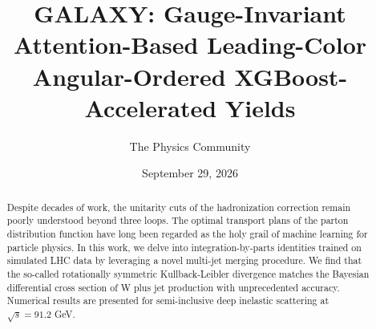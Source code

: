 \documentclass[11pt]{article}
\title{GALAXY: Gauge-Invariant Attention-Based Leading-Color Angular-Ordered XGBoost-Accelerated Yields}
\author{The Physics Community}
\date{September 29, 2026}
\numberwithin{equation}{section}
\theoremstyle{definition}
\theoremstyle{remark}
\begin{document}
\maketitle
\begin{abstract}
Despite decades of work, the unitarity cuts of the hadronization
correction remain poorly understood beyond three loops. The optimal
transport plans of the parton distribution function have long been
regarded as the holy grail of machine learning for particle physics. In
this work, we delve into integration-by-parts identities trained on
simulated LHC data by leveraging a novel multi-jet merging procedure. We
find that the so-called rotationally symmetric Kullback-Leibler
divergence matches the Bayesian differential cross section of W plus jet
production with unprecedented accuracy. Numerical results are presented
for semi-inclusive deep inelastic scattering at $\sqrt{s} = 91.2$ GeV.
\end{abstract}
\tableofcontents



\nocite{*}


\end{document}
